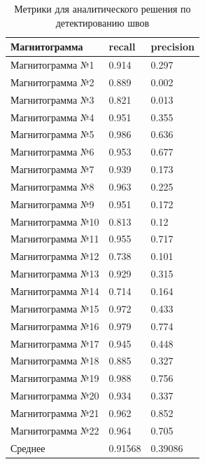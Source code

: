 \documentclass[a4paper,article,14pt]{extarticle}
\begin{document}
\begin{center}
    \begin{longtable}{|p{5cm}|p{3cm}|p{3cm}|}
        \caption{Метрики для аналитического решения по детектированию швов}\\\hline
        Магнитограмма & recall & precision \\ \hline
        Магнитограмма №1 & 0.914 & 0.297 \\ \hline
        Магнитограмма №2 & 0.889 & 0.002 \\ \hline
        Магнитограмма №3 & 0.821 & 0.013 \\ \hline
        Магнитограмма №4 & 0.951 & 0.355 \\ \hline
        Магнитограмма №5 & 0.986 & 0.636 \\ \hline
        Магнитограмма №6 & 0.953 & 0.677 \\ \hline
        Магнитограмма №7 & 0.939 & 0.173 \\ \hline
        Магнитограмма №8 & 0.963 & 0.225 \\ \hline
        Магнитограмма №9 & 0.951 & 0.172 \\ \hline
        Магнитограмма №10 & 0.813 & 0.12 \\ \hline
        Магнитограмма №11 & 0.955 & 0.717 \\ \hline
        Магнитограмма №12 & 0.738 & 0.101 \\ \hline
        Магнитограмма №13 & 0.929 & 0.315 \\ \hline
        Магнитограмма №14 & 0.714 & 0.164 \\ \hline
        Магнитограмма №15 & 0.972 & 0.433 \\ \hline
        Магнитограмма №16 & 0.979 & 0.774 \\ \hline
        Магнитограмма №17 & 0.945 & 0.448 \\ \hline
        Магнитограмма №18 & 0.885 & 0.327 \\ \hline
        Магнитограмма №19 & 0.988 & 0.756 \\ \hline
        Магнитограмма №20 & 0.934 & 0.337 \\ \hline
        Магнитограмма №21 & 0.962 & 0.852 \\ \hline
        Магнитограмма №22 & 0.964 & 0.705 \\ \hline
        Среднее & 0.91568 & 0.39086 \\ \hline
    \end{longtable}
\end{center}
\end{document}
